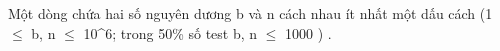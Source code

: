 Một dòng chứa hai số nguyên dương b       và n       cách nhau ít nhất một dấu cách (1  $\le$  b, n  $\le$  10^6; trong 50\% số test b, n  $\le$  1000       )      .